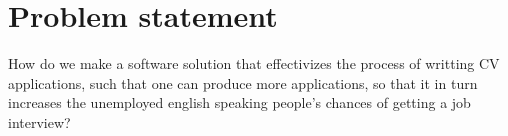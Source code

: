\section{Problem statement}\label{sec:problem}
How do we make a software solution that effectivizes the process of writting CV applications, such that one can produce more applications, 
so that it in turn increases the unemployed english speaking people's chances of getting a job interview?